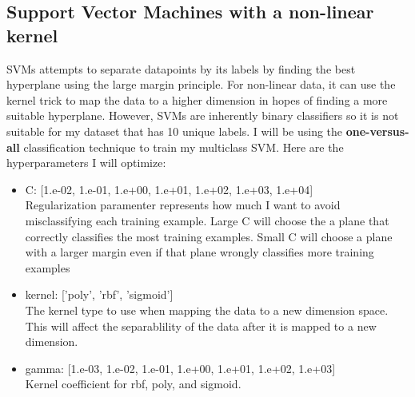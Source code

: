 \documentclass[12pt]{article}
\begin{document}
\subsection{Support Vector Machines with a non-linear kernel}
SVMs attempts to separate datapoints by its labels by finding the best hyperplane using the large margin principle. For non-linear data, it can use the kernel trick to map the data to a higher dimension in hopes of finding a more suitable hyperplane. However, SVMs are inherently binary classifiers so it is not suitable for my dataset that has 10 unique labels. I will be using the \textbf{one-versus-all} classification technique to train my multiclass SVM. Here are the hyperparameters I will optimize:
\begin{itemize}
    \item C: [1.e-02, 1.e-01, 1.e+00, 1.e+01, 1.e+02, 1.e+03, 1.e+04]
    \\ Regularization paramenter represents how much I want to avoid misclassifying each training example. Large C will choose the a plane that correctly classifies the most training examples. Small C will choose a plane with a larger margin even if that plane wrongly classifies more training examples
    \item kernel: ['poly', 'rbf', 'sigmoid'] 
    \\ The kernel type to use when mapping the data to a new dimension space. This will affect the separablility of the data after it is mapped to a new dimension.
    \item gamma: [1.e-03, 1.e-02, 1.e-01, 1.e+00, 1.e+01, 1.e+02, 1.e+03]
    \\ Kernel coefficient for rbf, poly, and sigmoid.
\end{itemize}
\end{document}
